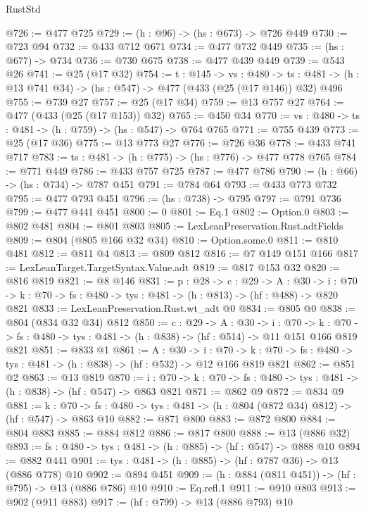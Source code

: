 \begin{lexlean}{RustStd}
\begin{coremodule}
@726 := @477 @725
@729 := (h : @96) -> (hs : @673) -> @726 @449
@730 := @723 @94
@732 := @433 @712 @671
@734 := @477 @732 @449
@735 := (hs : @677) -> @734
@736 := @730 @675
@738 := @477 @439 @449
@739 := @543 @26
@741 := @25 (@17 @32)
@754 := {t : @145} ->
  {vs : @480} ->
  {ts : @481} -> (h : @13 @741 @34) -> (hs : @547) -> @477 (@433 (@25 (@17 @146)) @32) @496
@755 := @739 @27
@757 := @25 (@17 @34)
@759 := @13 @757 @27
@764 := @477 (@433 (@25 (@17 @153)) @32)
@765 := @450 @34
@770 := {vs : @480} -> {ts : @481} -> (h : @759) -> (hs : @547) -> @764 @765
@771 := @755 @439
@773 := @25 (@17 @36)
@775 := @13 @773 @27
@776 := @726 @36
@778 := @433 @741 @717
@783 := {ts : @481} -> (h : @775) -> (hs : @776) -> @477 @778 @765
@784 := @771 @449
@786 := @433 @757 @725
@787 := @477 @786
@790 := (h : @66) -> (hs : @734) -> @787 @451
@791 := @784 @64
@793 := @433 @773 @732
@795 := @477 @793 @451
@796 := (hs : @738) -> @795
@797 := @791 @736
@799 := @477 @441 @451
@800 := 0
@801 := Eq.{1}
@802 := Option.{0}
@803 := @802 @481
@804 := @801 @803
@805 := LexLeanPreservation.Rust.adtFields
@809 := @804 (@805 @166 @32 @34)
@810 := Option.some.{0}
@811 := @810 @481
@812 := @811 @4
@813 := @809 @812
@816 := @7 @149 @151 @166
@817 := LexLeanTarget.TargetSyntax.Value.adt
@819 := @817 @153 @32
@820 := @816 @819
@821 := @8 @146
@831 := {p : @28} ->
  {c : @29} ->
  {A : @30} ->
  {i : @70} -> {k : @70} -> {fs : @480} -> {tys : @481} -> (h : @813) -> (hf : @488) -> @820 @821
@833 := LexLeanPreservation.Rust.wt_adt @0
@834 := @805 @0
@838 := @804 (@834 @32 @34) @812
@850 := {c : @29} ->
  {A : @30} ->
  {i : @70} ->
  {k : @70} -> {fs : @480} -> {tys : @481} -> (h : @838) -> (hf : @514) -> @11 @151 @166 @819 @821
@851 := @833 @1
@861 := {A : @30} ->
  {i : @70} ->
  {k : @70} -> {fs : @480} -> {tys : @481} -> (h : @838) -> (hf : @532) -> @12 @166 @819 @821
@862 := @851 @2
@863 := @13 @819
@870 := {i : @70} ->
  {k : @70} -> {fs : @480} -> {tys : @481} -> (h : @838) -> (hf : @547) -> @863 @821
@871 := @862 @9
@872 := @834 @9
@881 := {k : @70} ->
  {fs : @480} -> {tys : @481} -> (h : @804 (@872 @34) @812) -> (hf : @547) -> @863 @10
@882 := @871 @800
@883 := @872 @800
@884 := @804 @883
@885 := @884 @812
@886 := @817 @800
@888 := @13 (@886 @32)
@893 := {fs : @480} -> {tys : @481} -> (h : @885) -> (hf : @547) -> @888 @10
@894 := @882 @441
@901 := {tys : @481} -> (h : @885) -> (hf : @787 @36) -> @13 (@886 @778) @10
@902 := @894 @451
@909 := (h : @884 (@811 @451)) -> (hf : @795) -> @13 (@886 @786) @10
@910 := Eq.refl.{1}
@911 := @910 @803
@913 := @902 (@911 @883)
@917 := (hf : @799) -> @13 (@886 @793) @10

\end{coremodule}
\end{lexlean}
